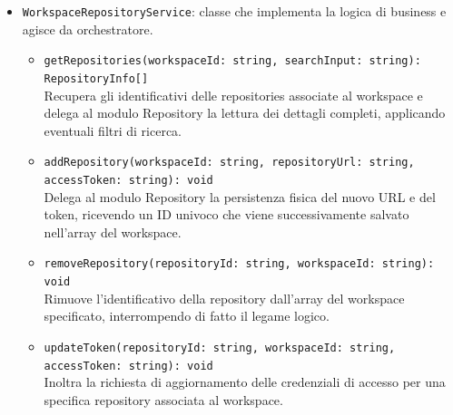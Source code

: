 \documentclass[a4paper, 11pt]{article}
\begin{document}
\begin{itemize}
\begin{itemize}
\begin{itemize}
          \item \texttt{addRepository(workspaceId: string, dto: AddRepositoryDto): void} \\
          Estrae i parametri dal DTO e invoca l'associazione di una nuova repository al workspace.

          \item \texttt{removeRepository(workspaceId: string, repositoryId: string): void} \\
          Gestisce la richiesta di eliminazione del legame tra una specifica repository e il workspace.

          \item \texttt{updateToken(workspaceId: string, repositoryId: string, dto: \\ AccessTokenDto): void} \\
          Riceve il nuovo token di accesso e ne comanda l'aggiornamento.
        \end{itemize}

        \item \texttt{WorkspaceRepositoryService}: classe che implementa la logica di business e agisce da orchestratore.
          \begin{itemize}
            \item \texttt{getRepositories(workspaceId: string, searchInput: string): RepositoryInfo[]} \\
            Recupera gli identificativi delle repositories associate al workspace e delega al modulo Repository la lettura dei dettagli completi, applicando eventuali filtri di ricerca.

            \item \texttt{addRepository(workspaceId: string, repositoryUrl: string, accessToken: string): void} \\
            Delega al modulo Repository la persistenza fisica del nuovo URL e del token, ricevendo un ID univoco che viene successivamente salvato nell'array del workspace.

            \item \texttt{removeRepository(repositoryId: string, workspaceId: string): void} \\
            Rimuove l'identificativo della repository dall'array del workspace specificato, interrompendo di fatto il legame logico.

            \item \texttt{updateToken(repositoryId: string, workspaceId: string, accessToken: string): void} \\
            Inoltra la richiesta di aggiornamento delle credenziali di accesso per una specifica repository associata al workspace.
          \end{itemize}


\end{itemize}
\end{itemize}
\end{document}

